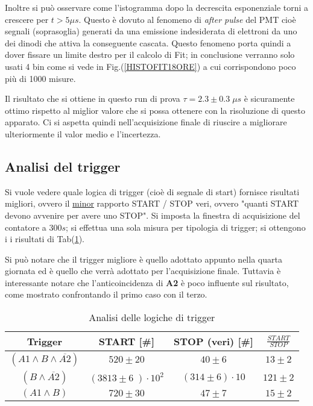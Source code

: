 \documentclass[12pt,a4paper,openright,twoside]{article}
\numberwithin{equation}{section} %
\begin{document}
Inoltre si può osservare come l'istogramma dopo la decrescita esponenziale torni a crescere per $t > 5 \mu s$.
Questo è dovuto al fenomeno di \textit{after pulse} del PMT cioè segnali (soprasoglia) generati da una emissione indesiderata di elettroni da uno dei dinodi che attiva la conseguente cascata.
Questo fenomeno porta quindi a dover fissare un limite destro per il calcolo di Fit; in conclusione verranno solo usati 4 bin come si vede in Fig.(\ref{HISTOFIT18ORE}) a cui corrispondono poco più di 1000 misure.

Il risultato che si ottiene in questo run di prova $\tau=2.3 \pm 0.3 \; \mu s $ è sicuramente ottimo rispetto al miglior valore che si possa ottenere con la risoluzione di questo apparato. Ci si aspetta quindi nell'acquisizione finale di riuscire a migliorare ulteriormente il valor medio e l'incertezza.


\subsection{Analisi del trigger}

Si vuole vedere quale logica di trigger (cioè di segnale di start) fornisce risultati migliori, ovvero il \underline{minor} rapporto START / STOP veri, ovvero "quanti START devono avvenire per avere uno STOP". Si imposta la finestra di acquisizione del contatore a $300s$; si effettua una sola misura per tipologia di trigger; si ottengono i i risultati di Tab(\ref{trig}).



Si può notare che il trigger migliore è quello adottato appunto nella quarta giornata ed è quello che verrà adottato per l'acquisizione finale. Tuttavia è interessante notare che l'anticoincidenza di \textbf{A2} è poco influente sul risultato, come mostrato confrontando il primo caso con il terzo.

\begin{table}[]
\centering
\renewcommand\arraystretch{1.2}
\begin{tabular}{|c|c|c|c|}
\hline
Trigger                              & START {[}\#{]}                  & STOP (veri) {[}\#{]} &$ \frac{START}{STOP}$ \\ \hline
$(A1 \wedge B \wedge \overline{A2})$ & $520\pm20$                      & $40\pm 6$                & $13\pm2$                  \\ \hline
$( B \wedge \overline{A2})$          & $(3813\pm6 \; )\cdot 10^2$   & $(314\pm6 ) \cdot 10$                & $121\pm2$                  \\ \hline
$(A1 \wedge B )$                     & $720\pm30$                      & $47\pm7$                & $15\pm2$          \\       \hline
\end{tabular}
\caption{Analisi delle logiche di trigger}
\label{trig}
\end{table}
\end{document}
